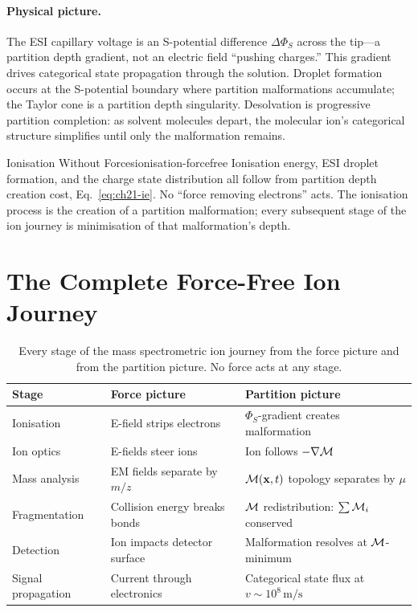 \paragraph{Physical picture.}
The ESI capillary voltage is an S-potential difference $\Delta\Phi_S$ across
the tip---a partition depth gradient, not an electric field ``pushing charges.''
This gradient drives categorical state propagation through the solution.
Droplet formation occurs at the S-potential boundary where partition
malformations accumulate; the Taylor cone is a partition depth singularity.
Desolvation is progressive partition completion: as solvent molecules depart,
the molecular ion's categorical structure simplifies until only the malformation
remains.

\begin{consequence}{Ionisation Without Forces}{ionisation-forcefree}
  Ionisation energy, ESI droplet formation, and the charge state distribution
  all follow from partition depth creation cost, Eq.~\eqref{eq:ch21-ie}.
  No ``force removing electrons'' acts.  The ionisation process is the
  creation of a partition malformation; every subsequent stage of the ion
  journey is minimisation of that malformation's depth.
\end{consequence}

\section{The Complete Force-Free Ion Journey}
\label{sec:ch21-journey}

\begin{table}[htbp]
\centering
\caption{Every stage of the mass spectrometric ion journey from the force
  picture and from the partition picture.  No force acts at any stage.}
\label{tab:ch21-journey}
\begin{tabular}{@{}lll@{}}
\toprule
\textbf{Stage} & \textbf{Force picture} & \textbf{Partition picture} \\
\midrule
Ionisation
  & E-field strips electrons
  & $\Phi_S$-gradient creates malformation \\
Ion optics
  & E-fields steer ions
  & Ion follows $-\nabla\mathcal{M}$ \\
Mass analysis
  & EM fields separate by $m/z$
  & $\mathcal{M}(\mathbf{x},t)$ topology separates by $\mu$ \\
Fragmentation
  & Collision energy breaks bonds
  & $\mathcal{M}$ redistribution: $\sum\mathcal{M}_i$ conserved \\
Detection
  & Ion impacts detector surface
  & Malformation resolves at $\mathcal{M}$-minimum \\
Signal propagation
  & Current through electronics
  & Categorical state flux at $v\sim 10^8\,\mathrm{m/s}$ \\
\bottomrule
\end{tabular}
\end{table}

